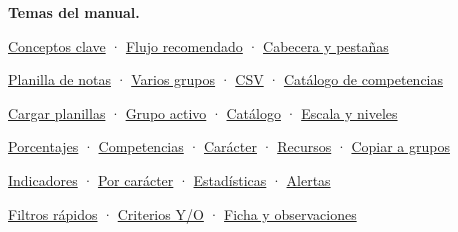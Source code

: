 \documentclass[11pt,letterpaper,oneside]{report}
\begin{document}
\textbf{Temas del manual.}

\begin{tcbraster}[raster columns=2,raster equal height=rows,raster column skip=8pt,raster row skip=4pt,
  enhanced,colback=white,colframe=primario!35,arc=3pt,fonttitle=\sffamily\bfseries\small,colbacktitle=fondo,coltitle=primariooscuro,
  left=5pt,right=5pt,top=3pt,bottom=3pt,fontupper=\footnotesize]
\begin{tcolorbox}[title={\hyperref[cap:intro]{\faHome\ 1. Introducción y conceptos}}]
\hyperref[sec:conceptos]{Conceptos clave} · \hyperref[sec:flujo]{Flujo recomendado} · \hyperref[sec:cabecera]{Cabecera y pestañas}
\end{tcolorbox}
\begin{tcolorbox}[title={\hyperref[cap:archivos]{\faFileExcel\ 2. Preparar los archivos}}]
\hyperref[sec:planilla]{Planilla de notas} · \hyperref[sec:variosgrupos]{Varios grupos} · \hyperref[sec:csv]{CSV} · \hyperref[sec:catalogo]{Catálogo de competencias}
\end{tcolorbox}
\begin{tcolorbox}[title={\hyperref[cap:datos]{\faFolderOpen\ 3. Pestaña 1 · Datos}}]
\hyperref[sec:cargarnotas]{Cargar planillas} · \hyperref[sec:listagrupos]{Grupo activo} · \hyperref[sec:cargarcatalogo]{Catálogo} · \hyperref[sec:escala]{Escala y niveles}
\end{tcolorbox}
\begin{tcolorbox}[title={\hyperref[cap:evaluaciones]{\faTasks\ 4. Pestaña 2 · Evaluaciones}}]
\hyperref[sec:pesos]{Porcentajes} · \hyperref[sec:asociar]{Competencias} · \hyperref[sec:caracterev]{Carácter} · \hyperref[sec:recursos]{Recursos} · \hyperref[sec:copiar]{Copiar a grupos}
\end{tcolorbox}
\begin{tcolorbox}[title={\hyperref[cap:analisis]{\faChartBar\ 5. Pestaña 3 · Análisis del grupo}}]
\hyperref[sec:kpis]{Indicadores} · \hyperref[sec:dimgrupo]{Por carácter} · \hyperref[sec:estadisticas]{Estadísticas} · \hyperref[sec:alertas]{Alertas}
\end{tcolorbox}
\begin{tcolorbox}[title={\hyperref[cap:estudiantes]{\faUserGraduate\ 6. Pestaña 4 · Estudiantes}}]
\hyperref[sec:rapidos]{Filtros rápidos} · \hyperref[sec:criterios]{Criterios Y/O} · \hyperref[sec:ficha]{Ficha y observaciones}
\end{tcolorbox}
\begin{tcolorbox}[title={\hyperref[cap:informes]{\faFilePdf\ 7. Pestaña 5 · Informes}}]

\end{tcolorbox}
\end{tcbraster}
\end{document}
